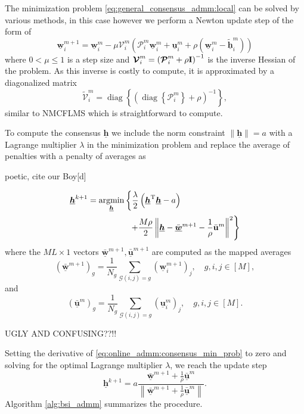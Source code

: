 \documentclass{article}
\newcommand{\uu}{\mtxb{u}}
\newcommand{\hf}{\underline{\bm{h}}}
\newcommand{\wf}{\underline{\bm{w}}}
\newcommand{\uuf}{\underline{\bm{u}}}
\newcommand{\aRhof}{\bm{\mathcal{P}}}
\newcommand{\I}{\mtxb{I}}
\begin{document}
The minimization problem \eqref{eq:general_consensus_admm:local} can be solved by various methods, in this case however we perform a Newton update step of the form of
\begin{equation}
    \wf_i^{m+1} = \wf_i^{m} - \mu \bm{\mathcal{V}}_i^m \left( \aRhof_i^m \wf_i^m + \uuf_i^m + \rho\left(\wf_i^m - \tilde{\hf}_i^{m}\right)\right)\label{eq:online_admm:local_update}
\end{equation}
where \(0  <\mu\leq 1\) is a step size and \(\bm{\mathcal{V}}_i^m = \left(\aRhof_i^m + \rho \I \right)^{-1}\) is the inverse Hessian of the problem.
As this inverse is costly to compute, it is approximated by a diagonalized matrix
\begin{equation}
    \tilde{\bm{\mathcal{V}}}_i^m = \operatorname{diag} \left\{ \left( \operatorname{diag} \left\{ \aRhof_i^m \right\} + \rho \right)^{-1}\right\},
\end{equation}
similar to NMCFLMS \cite{} which is straightforward to compute.

To compute the consensus \(\hf\) we include the norm constraint \(\|\hf\| = a\) with a Lagrange multiplier \(\lambda\) in the minimization problem and replace the average of penalties with a penalty of averages as
\begin{attention}
    poetic, cite our Boy[d]
\end{attention}
\begin{align}
    \hf^{k+1} &= \underset{\hf}{\operatorname{argmin}} \left\{ \frac{\lambda}{2} \left(\hf^\T \hf - a\right)\right.\nonumber\\
    &\left. \qquad \qquad \quad + \frac{M \rho}{2} \left\| \hf - \bar{\wf}^{m+1} - \frac{1}{\rho} \bar{\uu}^{m} \right\|^2 \right\}\label{eq:online_admm:consensus_min_prob}
\end{align}
where the \(M L \times 1\) vectors \(\bar{\wf}^{m+1}, \bar{\uuf}^{m+1}\) are computed as the mapped averages
\begin{equation}
    (\bar{\wf}^{m+1})_g = \frac{1}{N_g} \sum_{\mathcal{G}(i,j)=g} (\wf_i^{m+1})_j,\quad g,i,j \in [M],
\end{equation}
and
\begin{equation}
    (\bar{\uuf}^{m})_g = \frac{1}{N_g} \sum_{\mathcal{G}(i,j)=g} (\uuf_i^{m})_j,\quad g,i,j \in [M].
\end{equation}
\begin{attention}
    UGLY AND CONFUSING??!!
\end{attention}
Setting the derivative of \eqref{eq:online_admm:consensus_min_prob} to zero and solving for the optimal Lagrange multiplier \(\lambda\), we reach the update step
\begin{equation}
    \hf^{k+1} = a\frac{\bar{\wf}^{m+1} + \frac{1}{\rho} \bar{\uuf}^{m} }{\left\| \bar{\wf}^{m+1} + \frac{1}{\rho} \bar{\uuf}^{m} \right\|}.\label{eq:online_admm:consensus_update}
\end{equation}
Algorithm \ref{alg:bsi_admm} summarizes the procedure.
\end{document}
